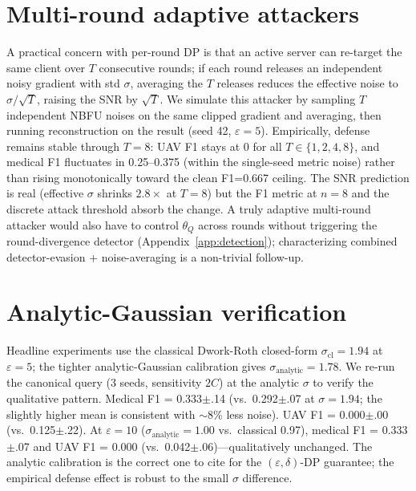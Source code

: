 \documentclass[11pt]{article}
\begin{document}
\section{Multi-round adaptive attackers}
\label{app:multiround}
A practical concern with per-round DP is that an active server can re-target the same client over $T$ consecutive rounds; if each round releases an independent noisy gradient with std $\sigma$, averaging the $T$ releases reduces the effective noise to $\sigma/\sqrt{T}$, raising the SNR by $\sqrt{T}$. We simulate this attacker by sampling $T$ independent NBFU noises on the same clipped gradient and averaging, then running reconstruction on the result (seed 42, $\varepsilon{=}5$). Empirically, defense remains stable through $T{=}8$: UAV F1 stays at 0 for all $T \in \{1,2,4,8\}$, and medical F1 fluctuates in 0.25--0.375 (within the single-seed metric noise) rather than rising monotonically toward the clean F1=0.667 ceiling. The SNR prediction is real (effective $\sigma$ shrinks $2.8\times$ at $T{=}8$) but the F1 metric at $n{=}8$ and the discrete attack threshold absorb the change. A truly adaptive multi-round attacker would also have to control $\theta_Q$ across rounds without triggering the round-divergence detector (Appendix~\ref{app:detection}); characterizing combined detector-evasion + noise-averaging is a non-trivial follow-up.

\section{Analytic-Gaussian verification}
\label{app:analytic}
Headline experiments use the classical Dwork-Roth closed-form $\sigma_{\text{cl}}{=}1.94$ at $\varepsilon{=}5$; the tighter analytic-Gaussian calibration gives $\sigma_{\text{analytic}}{=}1.78$. We re-run the canonical query (3 seeds, sensitivity $2C$) at the analytic $\sigma$ to verify the qualitative pattern. Medical F1 = 0.333$\pm$.14 (vs.\ 0.292$\pm$.07 at $\sigma{=}1.94$; the slightly higher mean is consistent with $\sim$8\% less noise). UAV F1 = 0.000$\pm$.00 (vs.\ 0.125$\pm$.22). At $\varepsilon{=}10$ ($\sigma_{\text{analytic}}{=}1.00$ vs.\ classical 0.97), medical F1 = 0.333$\pm$.07 and UAV F1 = 0.000 (vs.\ 0.042$\pm$.06)---qualitatively unchanged. The analytic calibration is the correct one to cite for the $(\varepsilon,\delta)$-DP guarantee; the empirical defense effect is robust to the small $\sigma$ difference.
\end{document}
